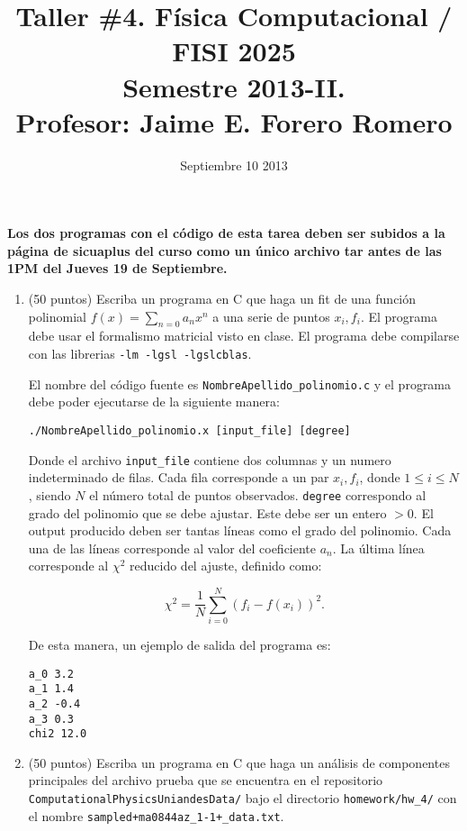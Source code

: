 \documentclass{article}
\title{Taller \#4. F\'isica Computacional / FISI 2025 \\Semestre 2013-II. \\ Profesor: Jaime E. Forero Romero}
\date{Septiembre 10 2013}
\begin{document}
\maketitle

{\bf Los dos programas con el c\'odigo de esta tarea deben ser subidos a la p\'agina de sicuaplus del curso como un \'unico archivo tar antes de las 1PM del Jueves 19 de Septiembre.}

\begin{enumerate}


\item (50 puntos) Escriba un programa en C que haga un fit de una
  funci\'on polinomial $f(x)=\sum_{n=0}a_nx^n$ a una serie de puntos
  $x_i, f_i$. El programa debe usar el formalismo matricial visto en
  clase. 
El programa debe compilarse con las librerias \verb"-lm -lgsl -lgslcblas".

El nombre del c\'odigo fuente es \verb"NombreApellido_polinomio.c" y el programa debe poder ejecutarse de la siguiente manera:

\begin{verbatim}
./NombreApellido_polinomio.x [input_file] [degree]
\end{verbatim}

Donde el archivo \verb"input_file" contiene dos columnas y un numero
indeterminado de filas. Cada fila corresponde a un par $x_i, f_i$,
donde $1\leq i\leq N$, siendo $N$ el n\'umero total de puntos
observados. \verb"degree" correspondo al grado del polinomio que se
debe ajustar. Este debe ser un entero $>0$. 
El output producido deben ser tantas l\'ineas como el grado del polinomio. Cada una de las l\'ineas corresponde al valor del coeficiente $a_n$. La \'ultima l\'inea corresponde al $\chi^2$ reducido del ajuste, definido como:

\begin{equation}
\chi^2 = \frac{1}{N}\sum_{i=0}^{N}(f_i - f(x_i))^2.
\end{equation}

De esta manera, un ejemplo de salida del programa es:

\begin{verbatim}
a_0 3.2
a_1 1.4
a_2 -0.4
a_3 0.3
chi2 12.0
\end{verbatim}

\item (50 puntos) Escriba un programa en C que haga un an\'alisis de
  componentes principales del archivo prueba que se encuentra en el
  repositorio \verb"ComputationalPhysicsUniandesData/" bajo el
  directorio \verb"homework/hw_4/" con el nombre
  \verb"sampled+ma0844az_1-1+_data.txt".  


\end{enumerate}
\end{document}
